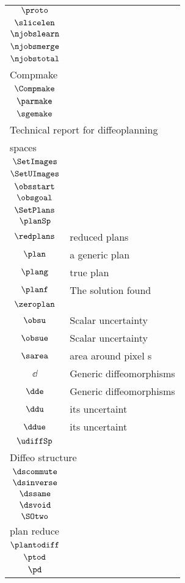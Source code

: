 \begin{longtable}{cl}
 $\proto$ & \\ 
 $\slicelen$ & \\ 
 $\njobslearn$ & \\ 
 $\njobsmerge$ & \\ 
 $\njobstotal$ & \\ 
 \multicolumn{2}{l}{Compmake}\\ 
 \hline
$\Compmake$ & \\ 
 $\parmake$ & \\ 
 $\sgemake$ & \\ 
 \multicolumn{2}{l}{Technical report for diffeoplanning}\\ 
 \hline
\multicolumn{2}{l}{spaces}\\ 
 \hline
$\SetImages$ & \\ 
 $\SetUImages$ & \\ 
 $\obsstart$ & \\ 
 $\obsgoal$ & \\ 
 $\SetPlans$ & \\ 
 $\planSp$ & \\ 
 $\redplans$ &  reduced plans\\ 
 $\plan$ &  a generic plan\\ 
 $\plang$ &  true plan\\ 
 $\planf$ &  The solution found \\ 
 $\zeroplan$ & \\ 
 $\obsu$ &  Scalar uncertainty\\ 
 $\obsue$ &  Scalar uncertainty\\ 
 $\sarea$ &  area around pixel s\\ 
 $\dd$ &  Generic diffeomorphisms\\ 
 $\dde$ &  Generic diffeomorphisms\\ 
 $\ddu$ &  its uncertaint\\ 
 $\ddue$ &  its uncertaint\\ 
 $\udiffSp$ & \\ 
 \multicolumn{2}{l}{Diffeo structure}\\ 
 \hline
$\dscommute$ & \\ 
 $\dsinverse$ & \\ 
 $\dssame$ & \\ 
 $\dsvoid$ & \\ 
 $\SOtwo$ & \\ 
 \multicolumn{2}{l}{plan reduce}\\ 
 \hline
$\plantodiff$ & \\ 
 $\ptod$ & \\ 
 $\pd$ & \\ 

\end{longtable}
